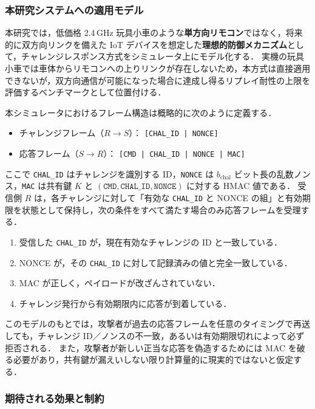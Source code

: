 \documentclass[twocolumn,10pt,a4paper]{jsarticle}
\begin{document}
\subsubsection{本研究システムへの適用モデル}

本研究では，低価格 2.4\,GHz 玩具小車のような\textbf{単方向リモコン}ではなく，将来的に双方向リンクを備えた IoT デバイスを想定した\textbf{理想的防御メカニズム}として，チャレンジレスポンス方式をシミュレータ上にモデル化する．
実機の玩具小車では車体からリモコンへの上りリンクが存在しないため，本方式は直接適用できないが，双方向通信が可能になった場合に達成し得るリプレイ耐性の上限を評価するベンチマークとして位置付ける．

本シミュレータにおけるフレーム構造は概略的に次のように定義する．

\begin{itemize}
  \item チャレンジフレーム（$R \rightarrow S$）：
        \texttt{[CHAL\_ID\ |\ NONCE]}
  \item 応答フレーム（$S \rightarrow R$）：
        \texttt{[CMD\ |\ CHAL\_ID\ |\ NONCE\ |\ MAC]}
\end{itemize}

ここで \texttt{CHAL\_ID} はチャレンジを識別する ID，\texttt{NONCE} は $b_{\mathrm{chal}}$ ビット長の乱数ノンス，\texttt{MAC} は共有鍵 $K$ と $(\texttt{CMD}, \texttt{CHAL\_ID}, \texttt{NONCE})$ に対する HMAC 値である．
受信側 $R$ は，各チャレンジに対して「有効な \texttt{CHAL\_ID} と NONCE の組」と有効期限を状態として保持し，次の条件をすべて満たす場合のみ応答フレームを受理する．

\begin{enumerate}
  \item 受信した \texttt{CHAL\_ID} が，現在有効なチャレンジの ID と一致している．
  \item NONCE が，その \texttt{CHAL\_ID} に対して記録済みの値と完全一致している．
  \item MAC が正しく，ペイロードが改ざんされていない．
  \item チャレンジ発行から有効期限内に応答が到着している．
\end{enumerate}

このモデルのもとでは，攻撃者が過去の応答フレームを任意のタイミングで再送しても，チャレンジ ID／ノンスの不一致，あるいは有効期限切れによって必ず拒否される．
また，攻撃者が新しい正当な応答を偽造するためには MAC を破る必要があり，共有鍵が漏えいしない限り計算量的に現実的ではないと仮定する．

\subsubsection{期待される効果と制約}
\end{document}
